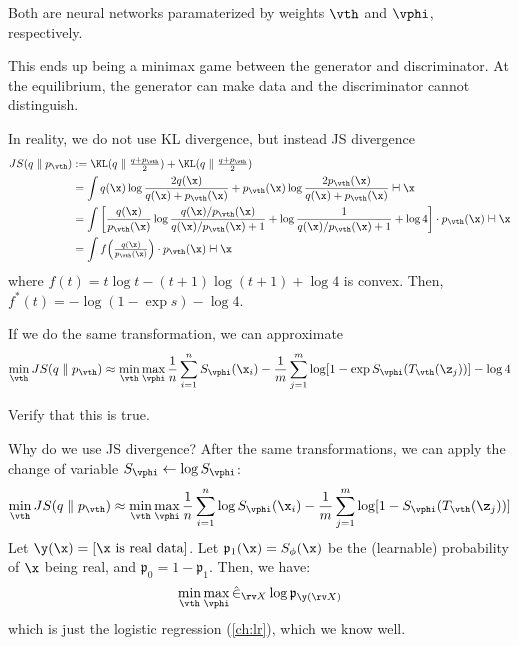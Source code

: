 \documentclass[class=cs480,notes,tikz]{agony}
\begin{document}
Both are neural networks paramaterized by weights $\vth$ and $\vphi$, respectively.

This ends up being a minimax game between the generator and discriminator.
At the equilibrium, the generator can make data and the discriminator cannot distinguish.

In reality, we do not use KL divergence, but instead JS divergence
\begin{align*}
  JS(q \parallel p_{\vth})
   & := \KL(q \parallel \tfrac{q+p_{\vth}}{2}) + \KL(q \parallel \tfrac{q+p_{\vth}}{2})                                                                                   \\
   & = \int q(\x) \log\frac{2q(\x)}{q(\x)+p_{\vth}(\x)} + p_{\vth}(\x)\log\frac{2p_{\vth}(\x)}{q(\x)+p_{\vth}(\x)} \dd{\x}                                                \\
   & = \int \qty[\frac{q(\x)}{p_{\vth}(\x)}\log\frac{q(\x)/p_{\vth}(\x)}{q(\x)/p_{\vth}(\x) + 1} + \log\frac{1}{q(\x)/p_{\vth}(\x)+1} + \log 4]\cdot p_{\vth}(\x) \dd{\x} \\
   & = \int f\qty(\tfrac{q(\x)}{p_{\vth}(\x)}) \cdot p_{\vth}(\x) \dd{\x}
\end{align*}
where $f(t) = t\log t - (t+1)\log(t+1) + \log4$ is convex.
Then, $f^*(t) = -\log(1-\exp s) - \log 4$.

If we do the same transformation, we can approximate
\[
  \min_{\vth} JS(q \parallel p_{\vth})
  \approx \min_{\vth} \max_{\vphi} \frac1n\sum_{i=1}^n S_{\vphi}(\x_i) - \frac1m \sum_{j=1}^m \log[1-\exp S_{\vphi}(T_{\vth}(\z_j))] - \log 4
\]

\begin{xca}
  Verify that this is true.
\end{xca}

Why do we use JS divergence? After the same transformations,
we can apply the change of variable $S_{\vphi} \gets \log S_{\vphi}$:
\[
  \min_{\vth} JS(q \parallel p_{\vth})
  \approx \min_{\vth} \max_{\vphi} \frac1n\sum_{i=1}^n \log S_{\vphi}(\x_i) - \frac1m \sum_{j=1}^m \log[1-S_{\vphi}(T_{\vth}(\z_j))]
\]
Let $\y(\x) = [\text{$\x$ is real data}]$.
Let $\mathfrak{p}_1(\x) = S_{\phi}(\x)$ be the (learnable) probability of $\x$ being real,
and $\mathfrak{p}_0 = 1 - \mathfrak{p}_1$. Then, we have:
\[ \min_{\vth} \max_{\vphi} \hat{\E}_{\rv X}\log \mathfrak{p}_{\y(\rv X)} \]
which is just the logistic regression (\cref{ch:lr}), which we know well.
\end{document}
